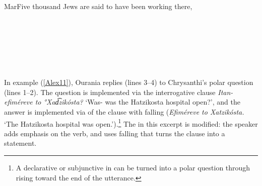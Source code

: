 \documentclass[output=paper]{LSP/langsci}
\begin{document}
\begin{Transcript}[FS {>}{>\hspace{0.1in}}]{Mar}{Five thousand Jews are said to have been working there,}%
\label{Alex10}%
\\
\\		
\\
 \\
\\
  \\ 
\\   
\end{Transcript}

In example (\ref{Alex11}), Ourania replies (lines 3--4) to Chrysanthi’s polar question (lines 1--2). The question is implemented via the interrogative clause \textit{Itan- efiméreve to °Xad͡zikósta?} `Was- was the Hatzikosta hospital open?', and the answer is implemented via  of the clause with falling  (\textit{Efiméreve to Xatzikósta.} `The Hatzikosta hospital was open.').\footnote{A declarative or subjunctive  in  can be turned into a polar question through rising  toward the end of the utterance.} The  in this excerpt is modified: the speaker adds emphasis on the verb, and uses falling  that turns the clause into a statement. 
\end{document}
